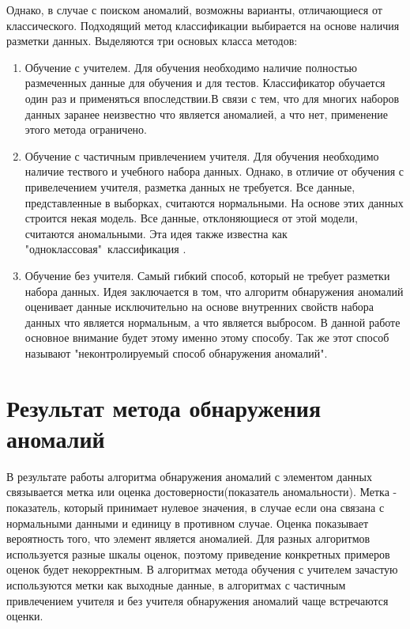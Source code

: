  Однако, в случае с поиском аномалий, возможны варианты, отличающиеся от классического. Подходящий метод классификации выбирается на основе наличия разметки данных.   Выделяются три основых класса методов:
\begin{enumerate}
\item Обучение с учителем. Для обучения необходимо наличие полностью  размеченных данные для обучения и для тестов. Классификатор  обучается один раз и применяться впоследствии.В связи с тем, что для многих наборов данных заранее неизвестно что является аномалией, а что нет, применение этого метода ограничено.
\item Обучение с частичным привлечением учителя. Для обучения необходимо наличие тествого и учебного набора данных. Однако, в отличие от обучения с привелечением учителя, разметка данных не требуется. Все данные, представленные в выборках, считаются нормальными. На основе этих данных строится некая модель. Все данные, отклоняющиеся от этой модели, считаются аномальными. Эта идея также известна как "одноклассовая"\ классификация \cite{Book03}.
\item Обучение без учителя.
Самый гибкий способ, который не требует разметки набора данных.  Идея заключается в том, что алгоритм обнаружения аномалий оценивает данные исключительно на основе внутренних свойств набора данных что является нормальным, а что является выбросом. В данной работе основное внимание будет этому  именно этому способу. Так же этот способ называют "неконтролируемый способ обнаружения  аномалий".
\end{enumerate}

\section{Результат метода обнаружения аномалий}
В результате работы алгоритма обнаружения аномалий  с элементом данных связывается  метка или оценка достоверности(показатель аномальности).  Метка - показатель, который принимает нулевое значения, в случае если она связана с нормальными данными и единицу в противном случае. Оценка показывает вероятность того, что элемент является аномалией. Для разных алгоритмов используется разные шкалы оценок, поэтому приведение конкретных примеров оценок будет некорректным.  В алгоритмах метода обучения с учителем зачастую используются метки как выходные данные, в  алгоритмах  с частичным привлечением учителя и без учителя  обнаружения аномалий чаще встречаются оценки.
